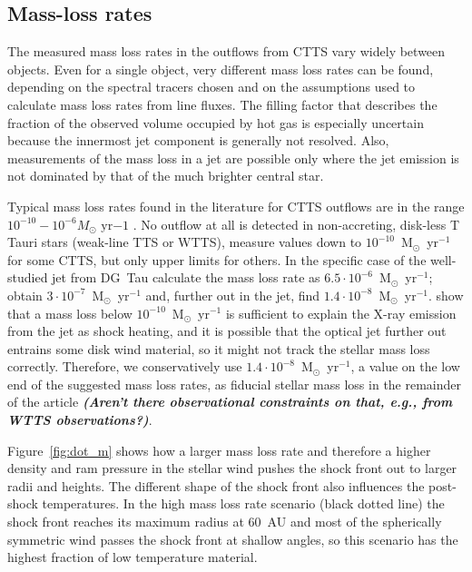 \subsection{Mass-loss rates}
The measured mass loss rates in the outflows from CTTS vary widely between objects.  Even for a single object, very different mass loss rates can be found, depending on the spectral tracers chosen and on the assumptions used to calculate mass loss rates from line fluxes. The filling factor that describes the fraction of the observed volume occupied by hot gas is especially uncertain because the innermost jet component is generally not resolved. Also, measurements of the mass loss in a jet are possible only where the jet emission is not dominated by that of the much brighter central star. 

Typical mass loss rates found in the literature for CTTS outflows are in the range $10^{-10}-10^{-6}M_{\odot}\textrm{ yr}{-1}$ \citep{1999A&A...342..717B,2006A&A...456..189P}. No outflow at all is detected in non-accreting, disk-less T Tauri stars (weak-line TTS or WTTS), \citet{2006ApJ...646..319E} measure values down to $10^{-10}$~M$_{\odot}$~yr$^{-1}$ for some CTTS, but only upper limits for others. In the specific case of the well-studied jet from DG~Tau \citet{1997A&A...327..671L} calculate the  mass loss rate as $6.5\cdot 10^{-6}$~M$_{\odot}$~yr$^{-1}$; \citet{1995ApJ...452..736H}
obtain $3\cdot 10^{-7}$~M$_{\odot}$~yr$^{-1}$ and, further out in the jet, \citet{2000A&A...356L..41L} find $1.4\cdot 10^{-8}$~M$_{\odot}$~yr$^{-1}$. 
\citet{2009A&A...493..579G} show that a mass loss below $10^{-10}$~M$_{\odot}$~yr$^{-1}$ is sufficient to explain the X-ray emission from the jet as shock heating, and it is possible that the optical jet further out entrains some disk wind material, so it might not track the stellar mass loss correctly.
Therefore, we conservatively use $1.4\cdot 10^{-8}$~M$_{\odot}$~yr$^{-1}$, a value on the low end of the suggested mass loss rates, as fiducial stellar mass loss in the remainder of the article \textbf{\textit{(Aren't there observational constraints on that, e.g., from WTTS observations?)}}.

Figure~\ref{fig:dot_m} shows how a larger mass loss rate and therefore a higher density and ram pressure in the stellar wind pushes the shock front out to larger radii and heights. The different shape of the shock front also influences the post-shock temperatures. In the high mass loss rate scenario (black dotted line) the shock front reaches its maximum radius at 60~AU and most of the spherically symmetric wind passes the shock front at shallow angles, so this scenario has the highest fraction of low temperature material.
